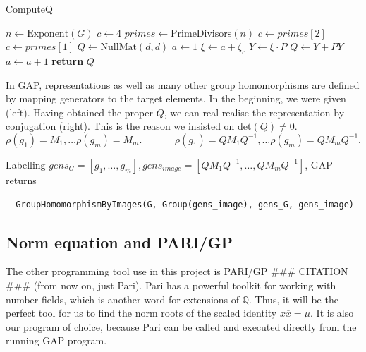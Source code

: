 \documentclass[11pt]{article}
\begin{document}
\begin{algorithm}
  \caption{ComputeQ}
  \label{alg:comp_q}
  \begin{algorithmic}
    \State $n \gets \text{Exponent}(G)$
      \State $c \gets 4$
    \Else
      \State $primes \gets \text{PrimeDivisors}(n)$
        \State $c \gets primes[2]$
      \Else
        \State $c \gets primes[1]$
      \EndIf
    \EndIf
    \State $Q \gets \text{NullMat}(d, d)$
    \State $a \gets 1$
      \State $\xi \gets a + \zeta_c$
      \State $Y \gets \xi \cdot P$
      \State $Q \gets \overline{Y} + \overline{P}Y$
      \State $a \gets a+1$
    \EndWhile
    \State \textbf{return} $Q$\
  \end{algorithmic}
\end{algorithm}

In GAP, representations as well as many other group homomorphisms are defined by mapping generators
to the target elements. In the beginning, we were given (left). Having obtained the proper $Q$, we
can real-realise the representation by conjugation (right). This is the reason we insisted on $\text{det}(Q) \neq 0$.
\[\rho(g_1) = M_1, \ldots \rho(g_m) = M_m.~~~~~~~~~~~~~~~\rho(g_1) = QM_1Q^{-1}, \ldots \rho(g_m) = QM_mQ^{-1}.\]

Labelling $gens_G = \left[g_1,\ldots,g_m\right], gens_{image} = \left[QM_1Q^{-1}, \ldots, QM_mQ^{-1}\right]$, GAP returns
\begin{verbatim}
  GroupHomomorphismByImages(G, Group(gens_image), gens_G, gens_image)
\end{verbatim}

\subsection{Norm equation and PARI/GP} \label{sec:pari}

The other programming tool use in this project is PARI/GP \#\#\# CITATION \#\#\#
(from now on, just Pari). Pari has a powerful toolkit for working with number
fields, which is another word for extensions of $\mathbb{Q}$. Thus, it will be the
perfect tool for us to find the norm roots of the scaled identity $x\overline{x}=\mu$.
It is also our program of choice, because Pari can be called and executed directly
from the running GAP program.
\end{document}
